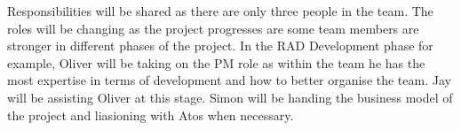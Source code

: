 Responsibilities will be shared as there are only three people in the team. The roles will be changing as the project progresses are some team members are stronger in different phases of the project. In the RAD Development phase for example, Oliver will be taking on the PM role as within the team he has the most expertise in terms of development and how to better organise the team. Jay will be assisting Oliver at this stage. Simon will be handing the business model of the project and liasioning with Atos when necessary. 